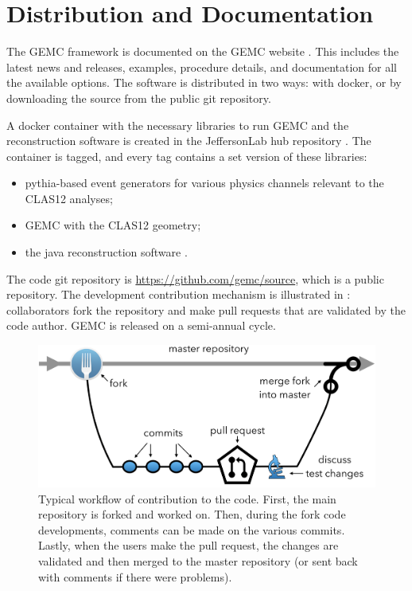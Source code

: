\section{Distribution and Documentation}

The GEMC framework is documented on the GEMC website \cite{GEMC}. This includes the latest news and releases,
examples, procedure details, and documentation for all the available options.
The software is distributed in two ways: with docker, or by downloading the source from the public git repository.


A docker container with the necessary libraries to run GEMC and the reconstruction software
is created in the JeffersonLab hub repository \cite{jlabDocker}.
The container is tagged, and every tag contains a set version of these libraries:

\begin{itemize}
	\item pythia-based event generators for various physics channels relevant to the CLAS12 analyses;
	\item GEMC with the CLAS12 geometry;
	\item the java reconstruction software \cite{recon-nim}.
\end{itemize}


The code git repository is \url{https://github.com/gemc/source}, which is a public repository.
The development contribution mechanism is illustrated in : collaborators fork the repository
and make pull requests that are validated by the code author.
GEMC is released on a semi-annual cycle.

\begin{figure}
	\centering
	\includegraphics[width=0.99\columnwidth,keepaspectratio]{img/github.png}
	\caption{Typical workflow of contribution to the code. First, the main repository is forked and worked on. Then, during the fork code developments,
	         comments can be made on the various commits. Lastly, when the users make the pull request, the changes are validated and then merged
             to the master repository (or sent back with comments if there were problems).}
	\label{fig:github}
\end{figure}


